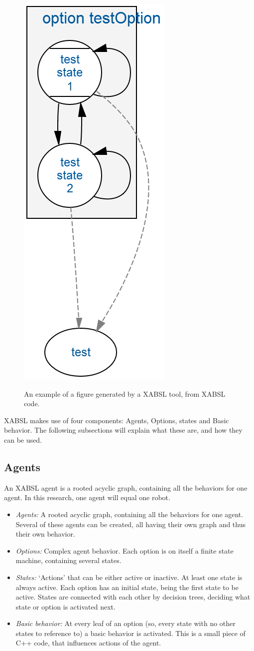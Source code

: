 \documentclass[a4paper,10pt]{article}
\begin{document}
\begin{multicols}{2}
\begin{figure}
    \centering
        \includegraphics[width=.2\textwidth]{simpleFsm.png}
    \label{fig:simpleFsm}
    \caption{An example of a figure generated by a XABSL tool, from XABSL code.}
\end{figure}

XABSL makes use of four components: Agents, Options, states and Basic behavior.
The following subsections will explain what these are, and how they can be used.

\subsection{Agents}
An XABSL agent is a rooted acyclic graph, containing all the behaviors for one
agent. In this research, one agent will equal one robot. 



\begin{itemize}
\item \emph{Agents:} A rooted acyclic graph, containing all the behaviors for one
agent. Several of these agents can be created, all having their own graph and
thus their own behavior.
\item \emph{Options:} Complex agent behavior. Each option is on itself a finite
state machine, containing several states.
\item \emph{States:} `Actions' that can be either active or inactive. At least
one state is always active. Each option has an initial state, being the first
state to be active. States are connected with each other by decision trees,
deciding what state or option is activated next.
\item \emph{Basic behavior:} At every leaf of an option (so, every state with no
other states to reference to) a basic behavior is activated. This is a small
piece of C++ code, that influences actions of the agent. 
\end{itemize}




\end{multicols}
\end{document}
